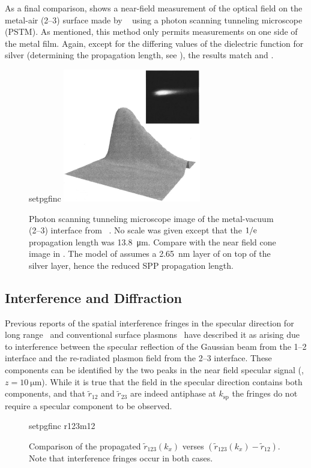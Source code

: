 As a final comparison,  shows a near-field
measurement of the optical field on the metal-air (2--3) surface made by
~\cite{dawson2001surface} using a photon scanning tunneling
microscope (PSTM).  As mentioned, this method only permits measurements on one
side of the metal film.  Again, except for the differing values of the
dielectric function for silver (determining the propagation length, see
), the results match  and 
.
\begin{figure}[ht]
\centering
{setpgfinc}
\includegraphics[keepaspectratio,width=6cm]{interference/figures/DawsonTransmitted.png}
\caption{Photon scanning tunneling microscope image of the metal-vacuum (2--3)
				interface from ~\cite{dawson2001surface}.  No scale was
				given except that the $1/{\mathrm{e}}$ propagation length was
				\SI{13.8}{\micro\meter}.  Compare with
				the near field cone image in .  The model of
				 assumes a \SI{2.65}{\nano\meter} layer of  on
				top of the silver layer, hence the reduced SPP propagation length.}
\label{fig:dawsoncompare}
\end{figure}


\subsection{Interference and Diffraction}
Previous reports of the spatial interference fringes in the specular direction
for long range~\cite{simon2007observation} and conventional surface
plasmons~\cite{schumann2008near} have described it as arising due to
interference between the specular reflection of the Gaussian beam from the
1--2 interface and the re-radiated plasmon field from the 2--3 interface.
These components can be identified by the two peaks in the near field specular
signal (, $z=\SI{10}{\micro\meter}$).  While it is
true that the field in the specular direction contains both components, and
that $\tilde{r}_{12}$ and $\tilde{r}_{23}$ are indeed antiphase at
$k_\text{sp}$ the fringes do not require a specular component to be observed.
\begin{figure}[ht]
\centering
{setpgfinc}
{r123m12}
\caption{Comparison of the propagated $\tilde{r}_{123}(k_x)$ verses
$(\tilde{r}_{123}(k_x)-\tilde{r}_{12})$.  Note that interference fringes occur in
both cases.  }
\label{fig:r123m12}
\end{figure}

